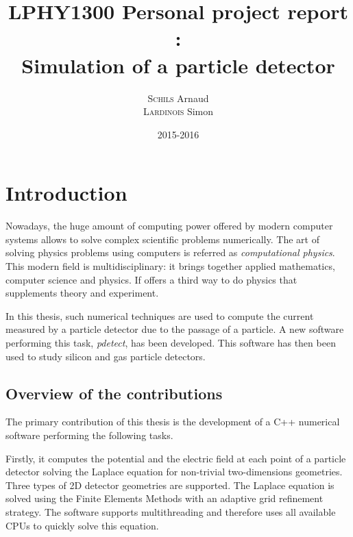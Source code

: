 \documentclass[11pt]{article}
\title{LPHY1300 Personal project report :\\ Simulation of a particle detector}
\author{\textsc{Schils} Arnaud\\ \textsc{Lardinois} Simon}
\date{2015-2016}
\begin{document}
\maketitle
\newpage
\renewcommand{\contentsname}{Table of contents}
\tableofcontents




\newpage
\section*{Introduction}

Nowadays, the huge amount of computing power offered by modern computer systems allows
to solve complex scientific problems numerically. The art of solving physics problems using
computers is referred as \textit{computational physics}. This modern field
is multidisciplinary: it brings together applied mathematics,
computer science and physics. If offers a third way to do physics
that supplements theory and experiment.

In this thesis, such numerical techniques are used to compute the current measured
by a particle detector due to the passage of a particle. A new software performing this task,
\textit{pdetect}, has been developed. This software has then been used to study
silicon and gas particle detectors.


	\subsection*{Overview of the contributions}

	The primary contribution of this thesis is the development of a C++ numerical software performing the
	following tasks.

	Firstly, it computes the potential and the electric field
	at each point of a particle detector solving the Laplace equation for non-trivial
	two-dimensions geometries. Three types of 2D detector geometries are supported.
	The Laplace equation is solved using the Finite Elements Methods with an adaptive
	grid refinement strategy. The software supports multithreading and therefore
	uses all available CPUs to quickly solve this equation.
\end{document}
